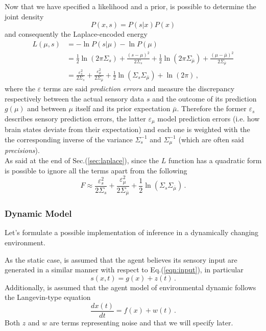\documentclass[a4paper, 10pt]{article}
\begin{document}
Now that we have specified a likelihood and a prior, is possible to determine the joint density
\begin{equation}
P(x,s) = P(s | x) P(x)
\end{equation}
and consequently the Laplace-encoded energy
\begin{equation}
\begin{split}
L(\mu,s) & = - \ln P(s|\mu) - \ln P(\mu)  \\
		 & = \frac{1}{2} \ln (2 \pi \Sigma_{s}) + \frac{(s-\mu)^2}{2 \Sigma_{s}} + \frac{1}{2} \ln (2 \pi \Sigma_{\bar{\mu}}) + \frac{(\mu-\bar{\mu})^2}{2 \Sigma_{\bar{\mu}}} \\
		 & = \frac{\varepsilon_{s}^2}{2 \Sigma_{s}} + \frac{\varepsilon_{\mu}^2}{2 \Sigma_{\bar{\mu}}} + \frac{1}{2} \ln \left( \Sigma_{s} \Sigma_{\bar{\mu}} \right) + \ln (2 \pi) \, ,
\end{split}
\end{equation}
where the $\varepsilon$ terms are said \emph{prediction errors} and measure the discrepancy respectively between the actual sensory data $s$ and the outcome of its prediction $g(\mu)$ and between $\mu$ itself and its prior expectation $\bar{\mu}$. Therefore the former $\varepsilon_{s}$ describes sensory prediction errors, the latter $\varepsilon_{\mu}$ model prediction errors (i.e. how brain states deviate from their expectation) and each one is weighted with the the corresponding inverse of the variance $\Sigma_{s}^{-1}$ and $\Sigma_{\mu}^{-1}$ (which are often said \emph{precisions}). \\
As said at the end of Sec.(\ref{sec:laplace}), since the $L$ function has a quadratic form is possible to ignore all the terms apart from the following
\begin{equation}
F \approx \frac{\varepsilon_{s}^2}{2 \Sigma_{s}} + \frac{\varepsilon_{\mu}^2}{2 \Sigma_{\bar{\mu}}} + \frac{1}{2} \ln \left( \Sigma_{s} \Sigma_{\bar{\mu}} \right) \, .
\end{equation}


\subsubsection{Dynamic Model}
Let's formulate a possible implementation of inference in a dynamically changing environment.

As the static case, is assumed that the agent believes its sensory input are generated in a similar manner with respect to Eq.(\ref{eqn:input}), in particular
\begin{equation}
s(x,t) = g(x) + z(t) \, .
\end{equation}
Additionally, is assumed that the agent model of environmental dynamic follows the Langevin-type equation
\begin{equation}
\frac{d x(t)}{dt} = f(x) + w(t) \, .
\end{equation}
Both $z$ and $w$ are terms representing noise and that we will specify later.
\end{document}
